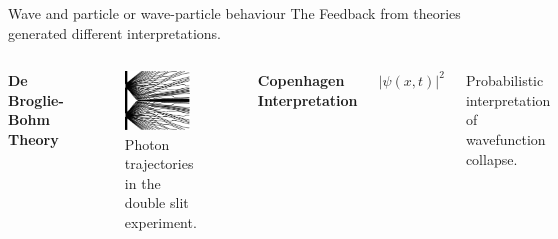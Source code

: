 \begin{frame}{Wave and particle or wave-particle behaviour}
  The Feedback from theories generated different interpretations. \cite{Struyve2001}

  \vspace{0.8cm}

  \begin{columns}
    \textbf{De Broglie-Bohm Theory}
    \begin{figure}
      \centering
      \includegraphics[width=0.9\textwidth]{Figures/doppel.pdf}
      \caption{Photon trajectories in the double slit experiment. \cite{Opasson2011}}
    \end{figure}
    
    \textbf{Copenhagen Interpretation}

    \vspace{0.8cm}

    \begin{equation*}
    \big| \psi(x, t) \big|^2
    \end{equation*}

    \vspace{1cm}
    Probabilistic interpretation of wavefunction collapse.
  \end{columns}
\end{frame}

